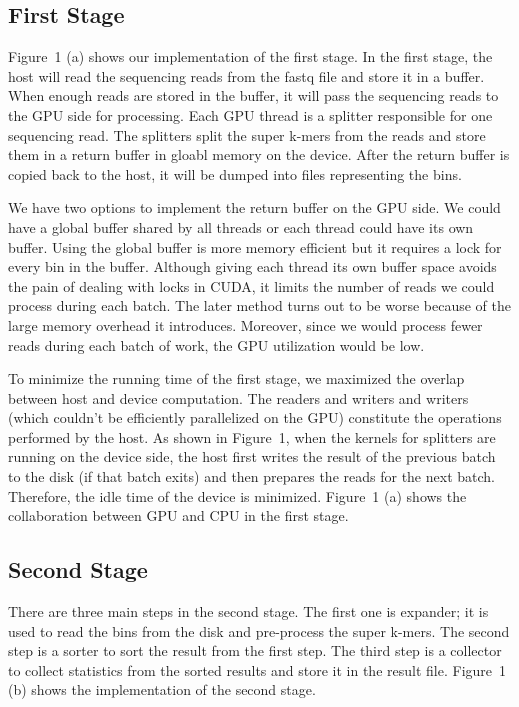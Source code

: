 \documentclass{bioinfo}
\begin{document}
\subsection{First Stage}
Figure~1\vphantom{\ref{fig:01}} (a) shows our implementation of the first stage.
In the first stage, the host will read the sequencing reads from the fastq file and store
it in a buffer.
When enough reads are stored in the buffer, it will pass the sequencing reads to the GPU
side for processing.
Each GPU thread is a splitter responsible for one sequencing read. The splitters
split the super k-mers from the reads and store them in a return buffer in gloabl memory on
the device.
After the return buffer is copied back to the host, it will be dumped into files 
representing the bins.

We have two options to implement the return buffer on the GPU side. We could
have a global buffer shared by all threads or each thread could have its own buffer.
Using the global buffer is more memory efficient but it requires a lock for every bin in
the buffer.
Although giving each thread its own buffer space avoids the pain of dealing with locks in
CUDA, it limits the number of reads we could process during each batch.
The later method turns out to be worse because of the large memory overhead it introduces.
Moreover, since we would process fewer reads during each batch of work, the GPU utilization
would be low.
\newpage

To minimize the running time of the first stage, we maximized the overlap between host and
device computation.
The readers and writers and writers (which couldn't be efficiently parallelized on the GPU)
 constitute the operations performed by the host.
As shown in Figure~1\vphantom{\ref{fig:01}}, when the kernels for splitters are running on
the device side, the host first writes the result of the previous batch to the disk (if
that batch exits) and then prepares the reads for the next batch.
Therefore, the idle time of the device is minimized.
Figure~1\vphantom{\ref{fig:01}} (a) shows the collaboration between GPU and CPU in
the first stage.
\subsection{Second Stage}
There are three main steps in the second stage.
The first one is expander; it is used to read the bins from the disk and pre-process the 
super k-mers. The second step is
a sorter to sort the result from the first step. The third step is a collector to collect
statistics from the sorted results and store it in the result file.
Figure~1\vphantom{\ref{fig:01}} (b) shows the implementation of the second stage.
\end{document}
